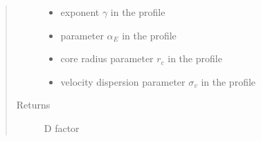\documentclass[letterpaper,10pt,english]{sphinxmanual}
\begin{document}
\begin{fulllineitems}
\begin{quote}
\begin{description}
\begin{itemize}
\item {} 
\sphinxAtStartPar
{} \textendash{} exponent \(\gamma\) in the {\hyperref[\detokenize{diffsph.profiles:diffsph.profiles.templates.hdz}]{}} profile

\item {} 
\sphinxAtStartPar
{} \textendash{} parameter \(\alpha_E\) in the {\hyperref[\detokenize{diffsph.profiles:diffsph.profiles.templates.enst}]{}} profile

\item {} 
\sphinxAtStartPar
{} \textendash{} core radius parameter \(r_c\) in the {\hyperref[\detokenize{diffsph.profiles:diffsph.profiles.templates.cnfw}]{}} profile

\item {} 
\sphinxAtStartPar
{} \textendash{} velocity dispersion parameter \(\sigma_v\) in the {\hyperref[\detokenize{diffsph.profiles:diffsph.profiles.templates.sis}]{}} profile

\end{itemize}

\item[{Returns}] \leavevmode
\sphinxAtStartPar
D factor

\end{description}\end{quote}

\end{fulllineitems}

\end{document}
